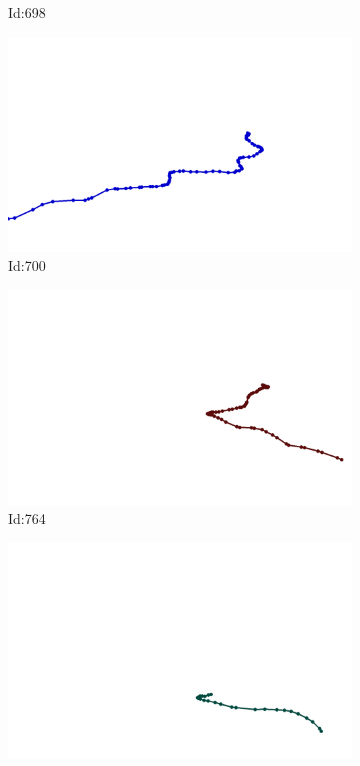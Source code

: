 \documentclass[12pt,twoside]{report}
\begin{document}
\begin{figure}
\begin{subfigure}[b]{0.20\textwidth}
\caption{Id:698}
\end{subfigure}
\begin{subfigure}[b]{0.20\textwidth}
\centering
\includegraphics[width=\textwidth]{../trajectories/700.png}
\caption{Id:700}
\end{subfigure}
\begin{subfigure}[b]{0.20\textwidth}
\centering
\includegraphics[width=\textwidth]{../trajectories/764.png}
\caption{Id:764}
\end{subfigure}
\begin{subfigure}[b]{0.20\textwidth}
\centering
\includegraphics[width=\textwidth]{../trajectories/769.png}

\end{subfigure}
\end{figure}
\end{document}
